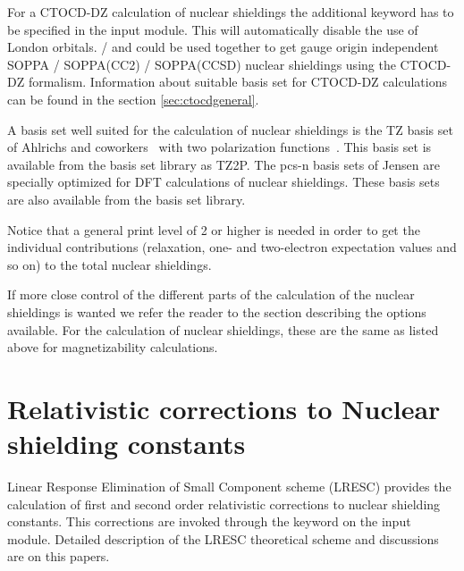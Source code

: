 For a CTOCD-DZ calculation of nuclear shieldings the
additional keyword  has to be specified in the
 input module. This will automatically disable the use
of London orbitals.  /  and  could be
used together to get gauge origin independent SOPPA / SOPPA(CC2) /
SOPPA(CCSD) nuclear shieldings using the CTOCD-DZ formalism.
Information about suitable basis set for CTOCD-DZ calculations can be
found in the section \ref{sec:ctocdgeneral}.

A basis set well suited for the calculation of nuclear shieldings is
the TZ basis set of Ahlrichs and
coworkers~\cite{ashhrajcp97,aschrajcp100} with two polarization
functions~\cite{thmjkrcr99}. This basis set is available from the basis
set library as TZ2P. The pcs-n basis sets of Jensen
\cite{bs08-jctc4-719} are specially optimized for DFT calculations of
nuclear shieldings. These basis sets are also available from the basis
set library.

Notice that a general print level of 2 or higher is needed in order to
get the individual contributions (relaxation, one- and
two-electron expectation values and so on) to the total nuclear shieldings.

If more close control of the different parts of the calculation of the
nuclear shieldings is wanted we refer the reader to the section
describing the options available. For the calculation of nuclear
shieldings, these are the same as listed above for magnetizability
calculations.



\section{Relativistic corrections to Nuclear shielding constants}\label{sec:lresc}

Linear Response Elimination of Small Component scheme (LRESC) provides the calculation
of first and second order relativistic corrections to nuclear shielding constants. 
This corrections are invoked through the keyword  on the  input module. Detailed description of the LRESC theoretical scheme and discussions are on this papers. 

